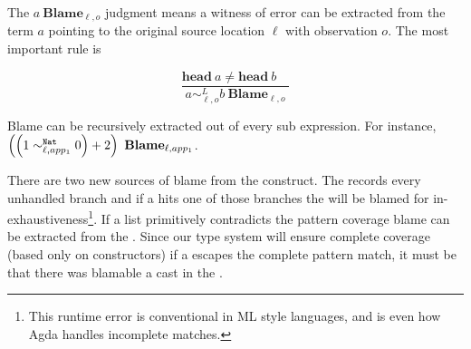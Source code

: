 The $a\ \mathbf{Blame}_{\ell,o}$ judgment means a witness of error can be extracted from the term $a$ pointing to the original source location $\ell$ with observation $o$.
The most important rule is

\[
\frac{\mathbf{head}\ a\neq\mathbf{head}\ b\quad}{a\sim_{\ell,o}^{L}b\ \mathbf{Blame}_{\ell,o}}
\]

Blame can be recursively extracted out of every sub expression.
For instance, $\left(\left(1\sim_{\ell,app_{1}}^{\mathtt{Nat}{} }0\right)+2\right)\ \mathbf{Blame}_{\ell,app_{1}}$.

There are two new sources of blame from the \case{} construct.
The \clang{} records every unhandled branch and if a \scrut{} hits one of those branches the \case{} will be blamed for in-exhaustiveness\footnote{
  This runtime error is conventional in ML style languages, and is even how Agda handles incomplete matches.
}.
If a \scrut{} list primitively contradicts the pattern coverage blame can be extracted from the \scrut{}. 
Since our type system will ensure complete coverage (based only on constructors) if a \scrut{} escapes the complete pattern match, it must be that there was blamable a cast in the \scrut.






